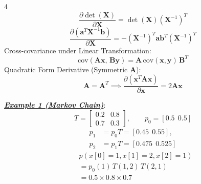 \documentclass[12pt]{article}
\newcommand{\bulletPoint}[1]{\ul{\textit{\textbf{#1}}}}
\begin{document}
\begin{multicols*}{4}
\useshortskip \begin{equation*}
    \frac{\partial \det(\mathbf{X})}{\partial \mathbf{X}}
    =\det(\mathbf{X})(\mathbf{X}^{-1})^T
\end{equation*}
\useshortskip \begin{equation*}
    \frac{\partial\!\left(\mathbf{a}^T\mathbf{X}^{-1}\mathbf{b}\right)}{\partial \mathbf{X}}
    =-(\mathbf{X}^{-1})^T\mathbf{a}\mathbf{b}^T(\mathbf{X}^{-1})^T
\end{equation*}
Cross-covariance under Linear Transformation:
\useshortskip \begin{equation*}
    \mathrm{cov}(\mathbf{A}\mathbf{x},\, \mathbf{B}\mathbf{y}) = \mathbf{A}\,\mathrm{cov}(\mathbf{x},\mathbf{y})\,\mathbf{B}^T
\end{equation*}
Quadratic Form Derivative (Symmetric $\mathbf{A}$):
\useshortskip \begin{equation*}
    \mathbf{A} = \mathbf{A}^T \implies \frac{\partial(\mathbf{x}^T\mathbf{A}\mathbf{x})}{\partial \mathbf{x}} = 2\mathbf{A}\mathbf{x}
\end{equation*}

\bulletPoint{Example 1 (Markov Chain)}:
\useshortskip \begin{equation*}
    T=\begin{bmatrix}
    0.2 & 0.8\\
    0.7 & 0.3
    \end{bmatrix},\qquad
    p_0=[0.5\ \ 0.5]
\end{equation*}
\useshortskip \begin{equation*}
    \begin{split}
        p_1&=p_0T=[0.45\ \ 0.55],\\
        p_2&=p_1T=[0.475\ \ 0.525]
    \end{split}
\end{equation*}
\useshortskip \begin{equation*}
    \begin{split}
        &p(x[0]=1,x[1]=2,x[2]=1)\\
        &=p_0(1)\,T(1,2)\,T(2,1)\\
        &=0.5\times 0.8\times 0.7
    \end{split}
\end{equation*}


\end{multicols*}
\end{document}
